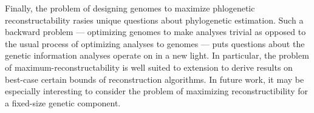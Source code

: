 Finally, the problem of designing genomes to maximize phlogenetic reconstructability rasies unique questions about phylogenetic estimation.
Such a backward problem --- optimizing genomes to make analyses trivial as opposed to the usual process of optimizing analyses to genomes --- puts questions about the genetic information analyses operate on in a new light.
In particular, the problem of maximum-reconstructability is well suited to extension to derive results on best-case certain bounds of reconstruction algorithms.
In future work, it may be especially interesting to consider the problem of maximizing reconstructibility for a fixed-size genetic component.
